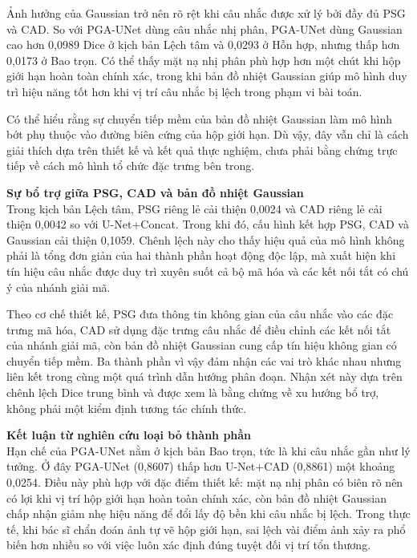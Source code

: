 Ảnh hưởng của Gaussian trở nên rõ rệt khi câu nhắc được xử lý bởi đầy đủ PSG và CAD. So với PGA-UNet dùng câu nhắc nhị phân, PGA-UNet dùng Gaussian cao hơn 0,0989 Dice ở kịch bản Lệch tâm và 0,0293 ở Hỗn hợp, nhưng thấp hơn 0,0173 ở Bao trọn. Có thể thấy mặt nạ nhị phân phù hợp hơn một chút khi hộp giới hạn hoàn toàn chính xác, trong khi bản đồ nhiệt Gaussian giúp mô hình duy trì hiệu năng tốt hơn khi vị trí câu nhắc bị lệch trong phạm vi bài toán.

Có thể hiểu rằng sự chuyển tiếp mềm của bản đồ nhiệt Gaussian làm mô hình bớt phụ thuộc vào đường biên cứng của hộp giới hạn. Dù vậy, đây vẫn chỉ là cách giải thích dựa trên thiết kế và kết quả thực nghiệm, chưa phải bằng chứng trực tiếp về cách mô hình tổ chức đặc trưng bên trong.

\noindent\textbf{Sự bổ trợ giữa PSG, CAD và bản đồ nhiệt Gaussian}\\
Trong kịch bản Lệch tâm, PSG riêng lẻ cải thiện 0,0024 và CAD riêng lẻ cải thiện 0,0042 so với U-Net+Concat. Trong khi đó, cấu hình kết hợp PSG, CAD và Gaussian cải thiện 0,1059. Chênh lệch này cho thấy hiệu quả của mô hình không phải là tổng đơn giản của hai thành phần hoạt động độc lập, mà xuất hiện khi tín hiệu câu nhắc được duy trì xuyên suốt cả bộ mã hóa và các kết nối tắt có chú ý của nhánh giải mã.

Theo cơ chế thiết kế, PSG đưa thông tin không gian của câu nhắc vào các đặc trưng mã hóa, CAD sử dụng đặc trưng câu nhắc để điều chỉnh các kết nối tắt của nhánh giải mã, còn bản đồ nhiệt Gaussian cung cấp tín hiệu không gian có chuyển tiếp mềm. Ba thành phần vì vậy đảm nhận các vai trò khác nhau nhưng liên kết trong cùng một quá trình dẫn hướng phân đoạn. Nhận xét này dựa trên chênh lệch Dice trung bình và được xem là bằng chứng về xu hướng bổ trợ, không phải một kiểm định tương tác chính thức.

\noindent\textbf{Kết luận từ nghiên cứu loại bỏ thành phần}\\
Hạn chế của PGA-UNet nằm ở kịch bản Bao trọn, tức là khi câu nhắc gần như lý tưởng. Ở đây PGA-UNet (0,8607) thấp hơn U-Net+CAD (0,8861) một khoảng 0,0254. Điều này phù hợp với đặc điểm thiết kế: mặt nạ nhị phân có biên rõ nên có lợi khi vị trí hộp giới hạn hoàn toàn chính xác, còn bản đồ nhiệt Gaussian chấp nhận giảm nhẹ hiệu năng để đổi lấy độ bền khi câu nhắc bị lệch. Trong thực tế, khi bác sĩ chẩn đoán ảnh tự vẽ hộp giới hạn, sai lệch vài điểm ảnh xảy ra phổ biến hơn nhiều so với việc luôn xác định đúng tuyệt đối vị trí tổn thương.

